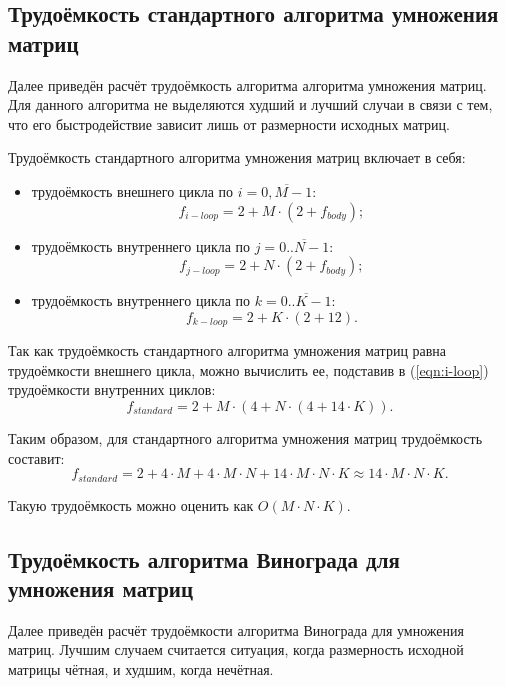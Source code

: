 \subsection{Трудоёмкость стандартного алгоритма умножения матриц}
Далее приведён расчёт трудоёмкость алгоритма алгоритма умножения матриц. Для данного алгоритма не выделяются худший и лучший случаи в связи с тем, что его быстродействие зависит лишь от размерности исходных матриц.

Трудоёмкость стандартного алгоритма умножения матриц включает в себя:
\begin{itemize}
	\item трудоёмкость внешнего цикла по $i = \overline{0,M-1}$: \begin{equation} \label{eqn:i-loop}
		f_{i-loop} = 2 + M \cdot (2 + f_{body});
	\end{equation}
	\item трудоёмкость внутреннего цикла по $j = \overline{0..N-1}$: \begin{equation}
		f_{j-loop} = 2 + N \cdot (2 + f_{body});
	\end{equation}
	\item трудоёмкость внутреннего цикла по $k = \overline{0..K-1}$: \begin{equation}
		f_{k-loop} = 2 + K \cdot (2 + 12).
	\end{equation}
\end{itemize}

Так как трудоёмкость стандартного алгоритма умножения матриц равна трудоёмкости внешнего цикла, можно вычислить ее, подставив в (\ref{eqn:i-loop}) трудоёмкости внутренних циклов:
\begin{equation}
	\label{for:standard}
	f_{standard} = 2 + M \cdot (4 + N \cdot (4 + 14 \cdot K)).
\end{equation}


Таким образом, для стандартного алгоритма умножения матриц трудоёмкость составит:
\begin{equation}
	f_{standard} = 2 + 4 \cdot M + 4 \cdot M \cdot N + 14 \cdot M \cdot N \cdot K \approx 14 \cdot M \cdot N \cdot K.
\end{equation}

Такую трудоёмкость можно оценить как $O(M \cdot N \cdot K)$.

\subsection{Трудоёмкость алгоритма Винограда для умножения матриц} \label{tv}
Далее приведён расчёт трудоёмкости алгоритма Винограда для умножения матриц. Лучшим случаем считается ситуация, когда размерность исходной матрицы чётная, и худшим, когда нечётная.


